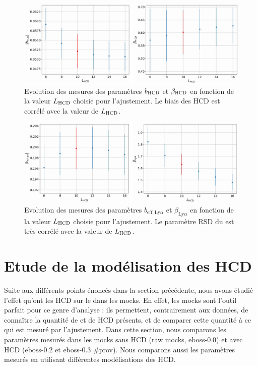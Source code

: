 \documentclass[11pt, twoside, a4paper, openright]{report}
\begin{document}
\begin{figure}
  \centering
  \includegraphics[scale=0.45]{bias_hcd_vs_L0}
  \caption{Evolution des mesures des paramètres $b_{\textsc{HCD}}$ et $\beta_{\textsc{HCD}}$ en fonction de la valeur $L_{\textsc{HCD}}$ choisie pour l'ajustement. Le biais des HCD est corrélé avec la valeur de $L_{\textsc{HCD}}$.}
  \label{fig:bias_hcd_vs_L0}
\end{figure}
\begin{figure}
  \centering
  \includegraphics[scale=0.45]{bias_lya_vs_L0}
  \caption{Evolution des mesures des paramètres $b_{\mathrm{eff},\mathrm{Ly}\alpha}$ et $\beta_{\mathrm{Ly}\alpha}$ en fonction de la valeur $L_{\textsc{HCD}}$ choisie pour l'ajustement. Le paramètre RSD du \lya{} est très corrélé avec la valeur de $L_{\textsc{HCD}}$.}
  \label{fig:bias_lya_vs_L0}
\end{figure}


\section{Etude de la modélisation des HCD}

Suite aux différents points énoncés dans la section précédente, nous avons étudié l'effet qu'ont les HCD sur le \lya{} dans les mocks.
En effet, les mocks sont l'outil parfait pour ce genre d'analyse : ils permettent, contrairement aux données, de connaître la quantité de \lya{} et de HCD présents, et de comparer cette quantité à ce qui est mesuré par l'ajustement.
Dans cette section, nous comparons les paramètres \lya{} mesurés dans les mocks sans HCD (raw mocks, eboss-0.0) et avec HCD (eboss-0.2 et eboss-0.3 \#prov). Nous comparons aussi les paramètres \lya{} mesurés en utilisant différentes modélisations des HCD.
\end{document}
